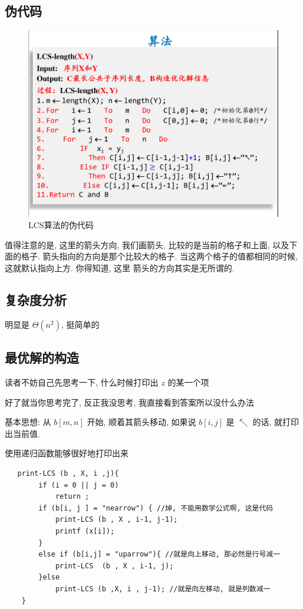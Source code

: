 \documentclass[a4paper, 10pt]{ctexart} %
\begin{document}
\subsection{伪代码}
\begin{figure}[H]
    \centering
    \includegraphics[scale =0.5]{13.png}
    \caption{LCS算法的伪代码}
\end{figure}
值得注意的是, 这里的箭头方向, 我们画箭头, 比较的是当前的格子和上面, 以及下面的格子.
箭头指向的方向是那个比较大的格子. 当这两个格子的值都相同的时候, 这就默认指向上方. 你得知道, 这里
箭头的方向其实是无所谓的.
\subsection{复杂度分析}
明显是 $\Theta \left(n ^{2}\right)$, 挺简单的
\subsection{最优解的构造}
读者不妨自己先思考一下, 什么时候打印出 $z$ 的某一个项

好了就当你思考完了, 反正我没思考, 我直接看到答案所以没什么办法

基本思想: 从 $b \left[ m,n \right]$ 开始, 顺着其箭头移动, 
如果说 $b\left[ i , j \right]$ 是 $\nwarrow$ 的话, 就打印出当前值.

使用递归函数能够很好地打印出来


\begin{verbatim}
   print-LCS (b , X, i ,j){
        if (i = 0 || j = 0)
            return ;
        if (b[i, j ] = "nearrow") { //焯, 不能用数学公式啊, 这是代码
            print-LCS (b , X , i-1, j-1);
            printf (x[i]);
        }
        else if (b[i,j] = "uparrow"){ //就是向上移动, 那必然是行号减一
            print-LCS  (b , X , i-1, j);
        }else 
            print-LCS (b ,X, i , j-1); //就是向左移动, 就是列数减一
    }
\end{verbatim}
\end{document}
